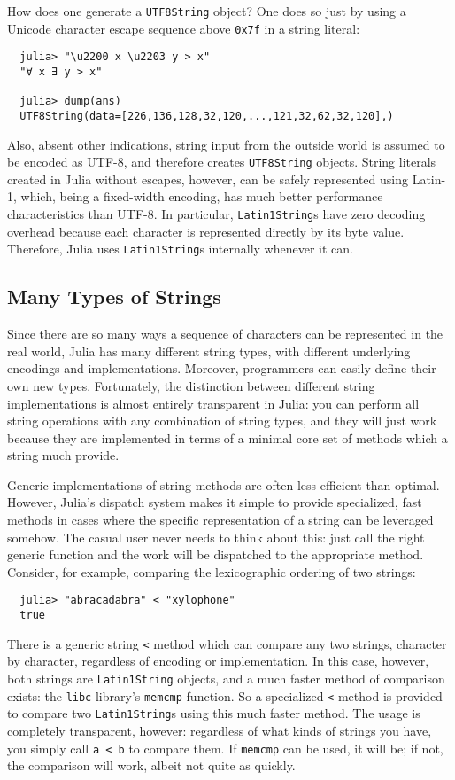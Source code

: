 \documentclass{article}
\begin{document}
How does one generate a \verb|UTF8String| object?
One does so just by using a Unicode character escape sequence above \verb|0x7f| in a string literal:
\begin{verbatim}
  julia> "\u2200 x \u2203 y > x"
  "∀ x ∃ y > x"

  julia> dump(ans)
  UTF8String(data=[226,136,128,32,120,...,121,32,62,32,120],)
\end{verbatim}
Also, absent other indications, string input from the outside world is assumed to be encoded as UTF-8, and therefore creates \verb|UTF8String| objects.
String literals created in Julia without escapes, however, can be safely represented using Latin-1, which, being a fixed-width encoding, has much better performance characteristics than UTF-8.
In particular, \verb|Latin1String|s have zero decoding overhead because each character is represented directly by its byte value.
Therefore, Julia uses \verb|Latin1String|s internally whenever it can.

\subsection{Many Types of Strings}

Since there are so many ways a sequence of characters can be represented in the real world, Julia has many different string types, with different underlying encodings and implementations.
Moreover, programmers can easily define their own new types.
Fortunately, the distinction between different string implementations is almost entirely transparent in Julia:
you can perform all string operations with any combination of string types, and they will just work because they are implemented in terms of a minimal core set of methods which a string much provide.

Generic implementations of string methods are often less efficient than optimal.
However, Julia's dispatch system makes it simple to provide specialized, fast methods in cases where the specific representation of a string can be leveraged somehow.
The casual user never needs to think about this:
just call the right generic function and the work will be dispatched to the appropriate method.
Consider, for example, comparing the lexicographic ordering of two strings:
\begin{verbatim}
  julia> "abracadabra" < "xylophone"
  true
\end{verbatim}
There is a generic string \verb|<| method which can compare any two strings, character by character, regardless of encoding or implementation.
In this case, however, both strings are \verb|Latin1String| objects, and a much faster method of comparison exists:
the \verb|libc| library's \verb|memcmp| function.
So a specialized \verb|<| method is provided to compare two \verb|Latin1String|s using this much faster method.
The usage is completely transparent, however:
regardless of what kinds of strings you have, you simply call \verb|a < b| to compare them.
If \verb|memcmp| can be used, it will be;
if not, the comparison will work, albeit not quite as quickly.
\end{document}
